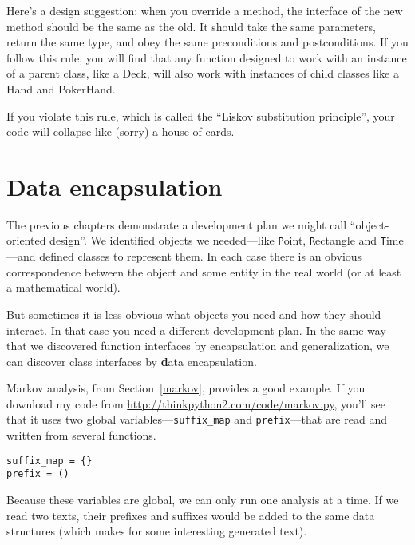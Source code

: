 \documentclass[
DIV=11,
fontsize=12,
twoside,
headinclude=false,
titlepage=firstiscover,
abstract=true,
headsepline=true,
footsepline=true,
chapterprefix=true, %
headings=big,
bibliography=totoc,%
captions=tableheading
]{scrbook}
\theoremstyle{definition}
\begin{document}
Here's a design suggestion: when you override a method,
the interface of the new method should be the same as the old.  It
should take the same parameters, return the same type, and obey the
same preconditions and postconditions.  If you follow this rule, you
will find that any function designed to work with an instance of a
parent class, like a Deck, will also work with instances of child
classes like a Hand and PokerHand.

If you violate this rule, which is called the ``Liskov substitution
principle'', your code will collapse like (sorry) a house of cards.


\section{Data encapsulation}

The previous chapters demonstrate a development plan we might call
``object-oriented design''.  We identified objects we needed---like
{\texttt Point}, {\texttt Rectangle} and {\texttt Time}---and defined classes to
represent them.  In each case there is an obvious correspondence
between the object and some entity in the real world (or at least a
mathematical world).  

But sometimes it is less obvious what objects you need
and how they should interact.  In that case you need a different
development plan.  In the same way that we discovered function
interfaces by encapsulation and generalization, we can discover
class interfaces by {\textbf data encapsulation}.

Markov analysis, from Section~\ref{markov}, provides a good example.
If you download my code from \url{http://thinkpython2.com/code/markov.py},
you'll see that it uses two global variables---\verb"suffix_map" and
\verb"prefix"---that are read and written from several functions.

\begin{lstlisting}
suffix_map = {}        
prefix = ()            
\end{lstlisting}

Because these variables are global, we can only run one analysis at a
time.  If we read two texts, their prefixes and suffixes would be
added to the same data structures (which makes for some interesting
generated text).
\end{document}
